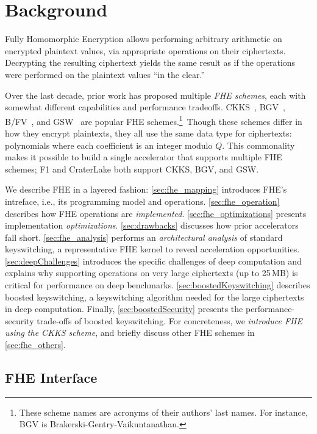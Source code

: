 \chapter{Background}\label{sec:background}

Fully Homomorphic Encryption allows performing arbitrary
arithmetic on encrypted plaintext values, via appropriate operations
on their ciphertexts. Decrypting the resulting ciphertext yields the
same result as if the operations were performed on the plaintext
values ``in the clear.''

Over the last decade, prior work has proposed multiple \emph{FHE schemes}, each
with somewhat different capabilities and performance tradeoffs.
CKKS~\cite{cheon:ictaci17:homomorphic}, BGV~\cite{brakerski:toct14:leveled},
B/FV~\cite{brakerski:crypto12:fully,fan:iacr12:somewhat}, and
GSW~\cite{gentry:crypto13:homomorphic} are popular FHE schemes.\footnote{These
scheme names are acronyms of their authors' last names. For instance, BGV is
Brakerski-Gentry-Vaikuntanathan.}~Though these schemes differ in how they
encrypt plaintexts, they all use the same data type for ciphertexts:
polynomials where each coefficient is an integer modulo $Q$. This commonality
makes it possible to build a single accelerator that supports multiple FHE
schemes; F1 and CraterLake both support CKKS, BGV, and GSW.

We describe FHE in a layered fashion: \autoref{sec:fhe_mapping} introduces
FHE's intreface, i.e., its programming model and operations.
\autoref{sec:fhe_operation} describes how FHE operations are
\emph{implemented}. \autoref{sec:fhe_optimizations} presents implementation
\emph{optimizations}. \autoref{sec:drawbacks} discusses how prior accelerators
fall short. \autoref{sec:fhe_analysis} performs an \emph{architectural
analysis} of standard keyswitching, a representative FHE kernel to reveal
acceleration opportunities. \autoref{sec:deepChallenges} introduces the
specific challenges of deep computation and explains why supporting operations
on very large ciphertexts (up to 25\,MB) is critical for performance on deep
benchmarks. \autoref{sec:boostedKeyswitching} describes boosted keyswitching, a
keyswitching algorithm needed for the large ciphertexts in deep computation.
Finally, \autoref{sec:boostedSecurity} presents the performance-security
trade-offs of boosted keyswitching. For concreteness, we \emph{introduce FHE
using the CKKS scheme}, and briefly discuss other FHE schemes in
\autoref{sec:fhe_others}.

\section{FHE Interface}
\label{sec:fhe_mapping}

